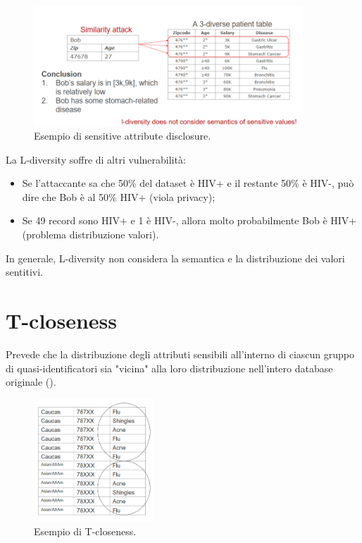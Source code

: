 \begin{figure}
    \centering
    \includegraphics[width=0.9\textwidth]{images/14-6.png}
    \caption{Esempio di sensitive attribute disclosure.}
    \label{fig:14-6}
\end{figure}

\noindent La L-diversity soffre di altri vulnerabilità:
\begin{itemize}
    \item Se l'attaccante sa che 50\% del dataset è HIV+ e il restante 50\% è HIV-, può dire che Bob è al 50\% HIV+ (viola privacy);
    \item Se 49 record sono HIV+ e 1 è HIV-, allora molto probabilmente Bob è HIV+ (problema distribuzione valori).
\end{itemize}

\noindent In generale, L-diversity non considera la semantica e la distribuzione dei valori sentitivi.

\section{T-closeness}

Prevede che la distribuzione degli attributi sensibili all'interno di ciascun gruppo di quasi-identificatori sia "vicina" alla loro distribuzione nell'intero database originale ().

\begin{figure}
    \centering
    \includegraphics[width=0.4\textwidth]{images/14-7.png}
    \caption{Esempio di T-closeness.}
    \label{fig:14-7}
\end{figure}


